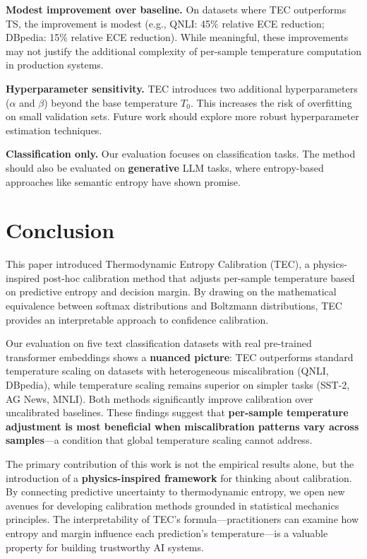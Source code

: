 \documentclass[11pt,letterpaper]{article}
\begin{document}
\textbf{Modest improvement over baseline.} On datasets where TEC outperforms TS, the improvement is modest (e.g., QNLI: 45\% relative ECE reduction; DBpedia: 15\% relative ECE reduction). While meaningful, these improvements may not justify the additional complexity of per-sample temperature computation in production systems.

\textbf{Hyperparameter sensitivity.} TEC introduces two additional hyperparameters ($\alpha$ and $\beta$) beyond the base temperature $T_0$. This increases the risk of overfitting on small validation sets. Future work should explore more robust hyperparameter estimation techniques.

\textbf{Classification only.} Our evaluation focuses on classification tasks. The method should also be evaluated on \textbf{generative} LLM tasks, where entropy-based approaches like semantic entropy \cite{Kuhn2023} have shown promise.

\section{Conclusion}

This paper introduced Thermodynamic Entropy Calibration (TEC), a physics-inspired post-hoc calibration method that adjusts per-sample temperature based on predictive entropy and decision margin. By drawing on the mathematical equivalence between softmax distributions and Boltzmann distributions, TEC provides an interpretable approach to confidence calibration.

Our evaluation on five text classification datasets with real pre-trained transformer embeddings shows a \textbf{nuanced picture}: TEC outperforms standard temperature scaling on datasets with heterogeneous miscalibration (QNLI, DBpedia), while temperature scaling remains superior on simpler tasks (SST-2, AG News, MNLI). Both methods significantly improve calibration over uncalibrated baselines. These findings suggest that \textbf{per-sample temperature adjustment is most beneficial when miscalibration patterns vary across samples}---a condition that global temperature scaling cannot address.

The primary contribution of this work is not the empirical results alone, but the introduction of a \textbf{physics-inspired framework} for thinking about calibration. By connecting predictive uncertainty to thermodynamic entropy, we open new avenues for developing calibration methods grounded in statistical mechanics principles. The interpretability of TEC's formula---practitioners can examine how entropy and margin influence each prediction's temperature---is a valuable property for building trustworthy AI systems.
\end{document}
